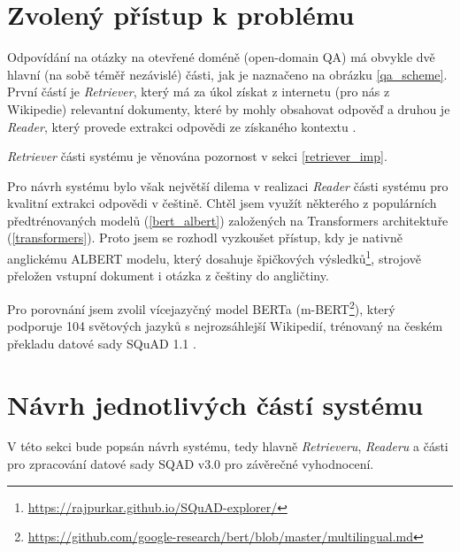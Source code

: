 \section{Zvolený přístup k problému}
Odpovídání na otázky na otevřené doméně (open-domain QA) má obvykle dvě hlavní (na sobě téměř nezávislé) části, jak je naznačeno na obrázku \ref{qa_scheme}. První částí je \emph{Retriever}, který má za úkol získat z internetu (pro nás z Wikipedie) relevantní dokumenty, které by mohly obsahovat odpověď a druhou je \emph{Reader}, který provede extrakci odpovědi ze získaného kontextu \cite{drQA}.\par
\noindent\emph{Retriever} části systému je věnována pozornost v sekci \ref{retriever_imp}.\par
Pro návrh systému bylo však největší dilema v realizaci \emph{Reader} části systému pro kvalitní extrakci odpovědi v češtině. Chtěl jsem využít některého z populárních předtrénovaných modelů (\ref{bert_albert}) založených na Transformers \cite{Transformers} architektuře (\ref{transformers}). Proto jsem se rozhodl vyzkoušet přístup, kdy je nativně anglickému ALBERT modelu, který dosahuje špičkových výsledků\footnote{\url{https://rajpurkar.github.io/SQuAD-explorer/}}, strojově přeložen vstupní dokument i otázka z češtiny do angličtiny.\par
Pro porovnání jsem zvolil vícejazyčný model BERTa (m-BERT\footnote{\url{https://github.com/google-research/bert/blob/master/multilingual.md}}), který podporuje 104 světových jazyků s nejrozsáhlejší Wikipedií, trénovaný na českém překladu datové sady SQuAD 1.1 \cite{czech_squad} \cite{squad}.\par

\section{Návrh jednotlivých částí systému}
\label{design}
V této sekci bude popsán návrh systému, tedy hlavně \emph{Retrieveru}, \emph{Readeru} a části pro zpracování datové sady SQAD v3.0 \cite{sqad} pro závěrečné vyhodnocení.

